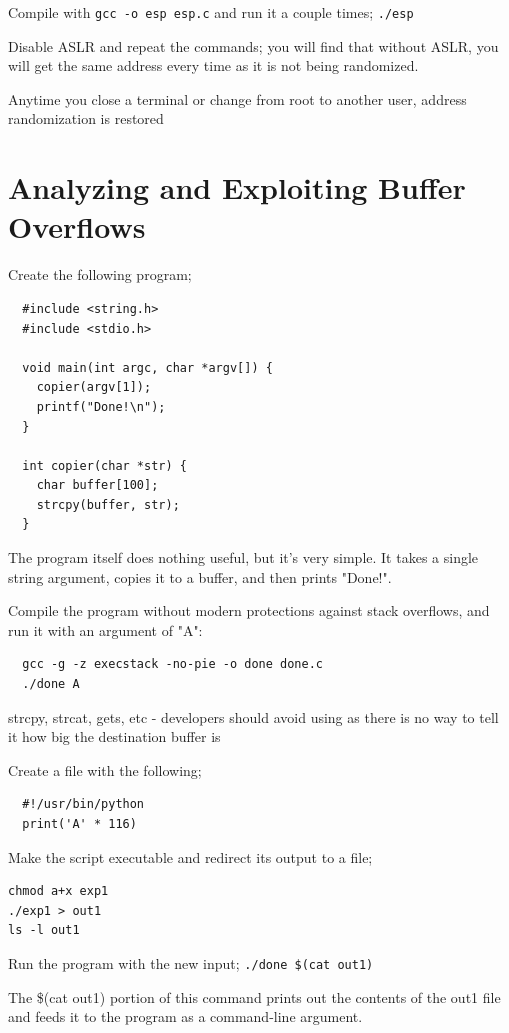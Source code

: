 \documentclass[]{project_plan}
\begin{document}
Compile with \lstinline|gcc -o esp esp.c| and run it a couple times; \lstinline|./esp|

Disable ASLR and repeat the commands; you will find that without ASLR, you will
get the same address every time as it is not being randomized.

Anytime you close a terminal or change from root to another user, address randomization is restored

\section{Analyzing and Exploiting Buffer Overflows}

Create the following program;
\begin{lstlisting}
  #include <string.h>
  #include <stdio.h>

  void main(int argc, char *argv[]) {
    copier(argv[1]);
    printf("Done!\n");
  }

  int copier(char *str) {
    char buffer[100];
    strcpy(buffer, str);
  }
\end{lstlisting}

The program itself does nothing useful, but it’s very simple. It
takes a single string argument, copies it to a buffer, and then prints "Done!".

Compile the program without modern protections against stack overflows,
and run it with an argument of "A":
\begin{lstlisting}
  gcc -g -z execstack -no-pie -o done done.c
  ./done A
\end{lstlisting}

strcpy, strcat, gets, etc - developers should avoid using as there is no way to
tell it how big the destination buffer is

Create a file with the following;
\begin{lstlisting}
  #!/usr/bin/python
  print('A' * 116)
\end{lstlisting}

Make the script executable and redirect its output to a file;
\begin{lstlisting}
chmod a+x exp1
./exp1 > out1
ls -l out1
\end{lstlisting}

Run the program with the new input; \lstinline|./done $(cat out1)|

The \$(cat out1) portion of this command prints out the contents of the
out1 file and feeds it to the program as a command-line argument.
\end{document}
